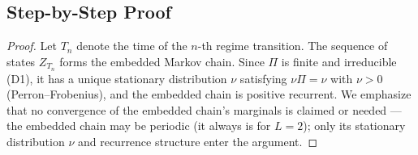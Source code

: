 \documentclass[11pt,a4paper]{article}
\begin{document}
\subsection{Step-by-Step Proof}
\begin{proof}
Let $T_n$ denote the time of the $n$-th regime transition. The sequence of states $Z_{T_n}$ forms the embedded Markov chain. Since $\Pi$ is finite and irreducible (D1), it has a unique stationary distribution $\nu$ satisfying $\nu \Pi = \nu$ with $\nu > 0$ (Perron--Frobenius), and the embedded chain is positive recurrent. We emphasize that no convergence of the embedded chain's marginals is claimed or needed --- the embedded chain may be periodic (it always is for $L = 2$); only its stationary distribution $\nu$ and recurrence structure enter the argument. %


\end{proof}
\end{document}
